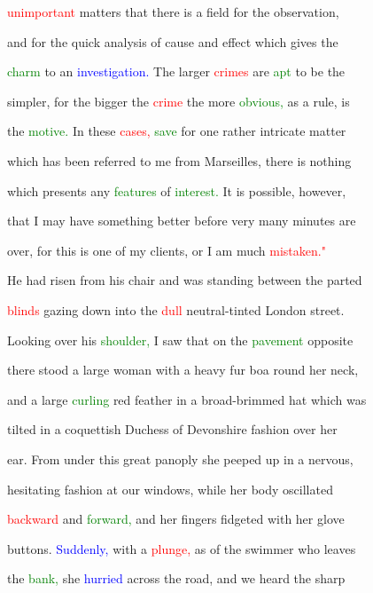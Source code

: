 \textcolor{red}{unimportant} matters that there is a field for the observation,

 and for the quick analysis of cause and effect which gives the

 \textcolor{green}{charm} to an \textcolor{blue}{investigation.} The larger \textcolor{red}{crimes} are \textcolor{green}{apt} to be the

 simpler, for the bigger the \textcolor{red}{crime} the more \textcolor{green}{obvious,} as a \textcolor{BurntOrange}{rule,} is

 the \textcolor{green}{motive.} In these \textcolor{red}{cases,} \textcolor{green}{save} for one rather intricate matter

 which has been referred to me from Marseilles, there is nothing

 which \textcolor{BurntOrange}{presents} any \textcolor{green}{features} of \textcolor{green}{interest.} It is possible, however,

 that I may have something better before very many minutes are

 over, for this is one of my clients, or I am much \textcolor{red}{mistaken."}



 He had risen from his chair and was standing between the parted

 \textcolor{red}{blinds} gazing down into the \textcolor{red}{dull} neutral-tinted London street.

 Looking over his \textcolor{green}{shoulder,} I saw that on the \textcolor{green}{pavement} opposite

 there stood a large woman with a heavy fur boa round her neck,

 and a large \textcolor{green}{curling} red feather in a broad-brimmed hat which was

 tilted in a coquettish Duchess of Devonshire fashion over her

 ear. From under this great panoply she peeped up in a \textcolor{BurntOrange}{nervous,}

 hesitating fashion at our windows, while her body oscillated

 \textcolor{red}{backward} and \textcolor{green}{forward,} and her fingers fidgeted with her glove

 buttons. \textcolor{blue}{Suddenly,} with a \textcolor{red}{plunge,} as of the swimmer who leaves

 the \textcolor{green}{bank,} she \textcolor{blue}{hurried} across the road, and we heard the sharp


